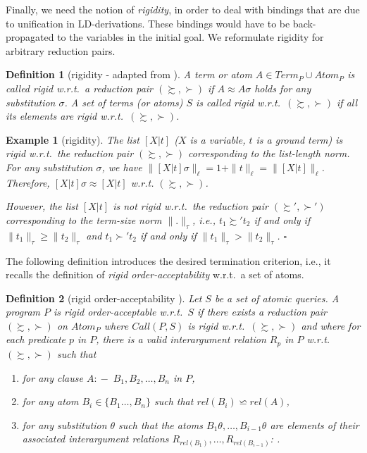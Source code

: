 \documentclass[envcountsame]{tlp}
\newcommand{\incase}{:\!\!-\;}
\newcounter{ex:der-lastsymconsctr}
\newtheorem{definition}{Definition}
\newtheorem{example}{Example}
\begin{document}
Finally, we need the notion of \emph{rigidity}, in order to deal with
bindings that are due to 
unification in LD-derivations. These bindings would have to be back-propagated
to the variables in the initial goal. We reformulate rigidity for arbitrary reduction
pairs.

\begin{definition}[rigidity - adapted from \cite{DeSchreyeSerebrenik01}] \label{def:rigidity}
A term or atom $A \in \mathit{Term}_P \cup \mathit{Atom}_P$ is called \emph{rigid}
w.r.t.\ a reduction pair $(\succsim,\succ)$ if $A \approx A \sigma$ holds for any
substitution $\sigma$. A set of terms (or atoms) $S$ is called \emph{rigid}
w.r.t.\ $(\succsim,\succ)$ if all its elements are rigid w.r.t.\ $(\succsim,\succ)$.
\end{definition}

\begin{example}[rigidity]\label{exam:rigidity}
The list $[X|t]$ ($X$ is a variable, $t$ is a ground term) is rigid w.r.t.\ the reduction
pair $(\succsim,\succ)$ corresponding to the list-length norm.
For any substitution
$\sigma$, we have ${\parallel}[X|t]{\sigma}{\parallel}_\ell =
1+{\parallel}t{\parallel}_\ell = {\parallel}[X|t]{\parallel}_\ell$. Therefore,
$[X|t]\sigma \approx [X|t]$ w.r.t. $(\succsim,\succ)$.

However, the list $[X|t]$ is not rigid w.r.t.\ the reduction pair $(\succsim',\succ')$
corresponding to the term-size norm ${\parallel}.{\parallel}_\tau$, i.e., $t_1 \succsim' t_2$
if and only if ${\parallel}t_1{\parallel}_\tau \ge
{\parallel}t_2{\parallel}_\tau$ and $t_1
\succ' t_2$ if and only if ${\parallel}t_1{\parallel}_\tau
> {\parallel}t_2{\parallel}_\tau$. 
{\hfill{$\mathit{\square}$}}
\end{example}

The following definition introduces the desired termination criterion, i.e., it
recalls the definition of \emph{rigid order-acceptability} w.r.t.\ a set of atoms.


\begin{definition}[rigid order-acceptability
\cite{DeSchreyeSerebrenik01}]\label{def:rigidacceptability} 
Let $S$ be a set of atomic queries. A  program $P$ is
\emph{rigid order-acceptable} w.r.t.\ $S$ if there exists a reduction pair $(\succsim,\succ)$
on $\mathit{Atom}_P$ 
where $\mathit{Call}(P,S)$ is rigid w.r.t.\ $(\succsim,\succ)$ and
where for each predicate $p$ in $P$, there is a valid  interargument
relation $R_{p}$ in $P$
w.r.t.\ $(\succsim,\succ)$ such that
\begin{enumerate}
\item[-] for any clause $A \incase B_1,B_2,\ldots,B_n$ in $P$,
\item[-] for any atom $B_i \in \{B_1\ldots,B_n\}$ such that $\mathit{rel}(B_i) \backsimeq \mathit{rel}(A)$,
\item[-] for any substitution $\theta$ such that the atoms
$B_1\theta, \ldots, B_{i-1}\theta$ are elements of their associated
interargument relations $R_{\mathit{rel}(B_1)}, \ldots,  R_{\mathit{rel}(B_{i-1})}$: 
                    .
\end{enumerate}
\end{definition}
\end{document}
